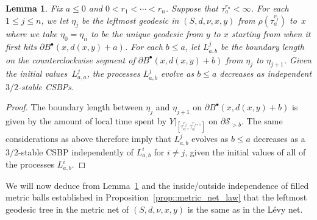 \documentclass[10pt]{amsart}
\let\mathcal\mathscr
\newcommand{\sbullet}{{\scriptscriptstyle\bullet}}
\theoremstyle{plain}
\numberwithin{theorem}{section}
\newtheorem{lemma}[theorem]{Lemma}
\theoremstyle{definition}
\newcommand{\snake}{{\mathcal S}}
\newcommand{\fb}[2]{B^\sbullet(#1,#2)}
\begin{document}
\begin{lemma}
\label{lem:geodesic_boundary_length_csbp}
Fix $a \leq 0$ and $0 < r_1 < \cdots < r_n$. Suppose that $\tau_{a}^{r_n} < \infty$. For each $1 \leq j \leq n$, we let $\eta_j$ be the leftmost geodesic in $(S,d,\nu,x,y)$ from $\rho(\tau_a^{r_j})$ to~$x$ where we take $\eta_0 = \eta_n$ to be the unique geodesic from $y$ to $x$ starting from when it first hits $\partial \fb{x}{d(x,y)+a}$. For each $b \leq a$, let $L_{a,b}^{j}$ be the boundary length on the counterclockwise segment of $\partial \fb{x}{d(x,y)+b}$ from $\eta_j$ to $\eta_{j+1}$. Given the initial values~$L_{a,a}^j$, the processes $L_{a,b}^j$ evolve as $b \leq a$ decreases as independent $3/2$-stable CSBPs.
\end{lemma}
\begin{proof}
The boundary length between $\eta_j$ and $\eta_{j+1}$ on $\partial \fb{x}{d(x,y)+b}$ is given by the amount of local time spent by $Y|_{[\tau_{a}^{r_j},\tau_a^{r_{j+1}}]}$ on $\partial \snake_{> b}$. The same considerations as above therefore imply that $L_{a,b}^j$ evolves as $b \leq a$ decreases as a $3/2$-stable CSBP independently of $L_{a,b}^i$ for $i \neq j$, given the initial values of all of the processes $L_{a,b}^i$.
\end{proof}

We will now deduce from Lemma~\ref{lem:geodesic_boundary_length_csbp} and the inside/outside independence of filled metric balls established in Proposition~\ref{prop::metric_net_law} that the leftmost geodesic tree in the metric net of $(S,d,\nu,x,y)$ is the same as in the Lévy net.
\end{document}
